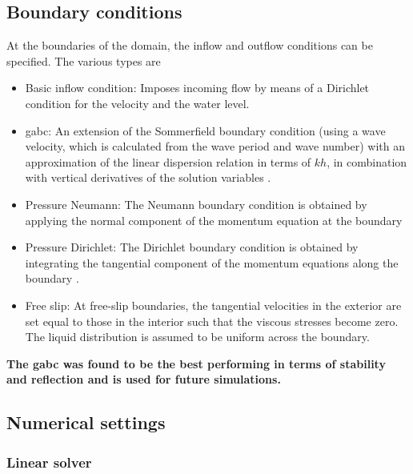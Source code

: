 \subsection{Boundary conditions}
At the boundaries of the domain, the inflow and outflow conditions can be specified. The various types are
\begin{itemize}
    \item Basic inflow condition: Imposes incoming flow by means of a Dirichlet condition for the velocity and the water level. 
    \item \acrfull{gabc}: An extension of the Sommerfield boundary condition (using a wave velocity, which is calculated from the wave period and wave number) with an approximation of the linear dispersion relation in terms of $k h$, in combination with vertical derivatives of the solution variables \citep{Wellens2020}. 
    \item Pressure Neumann: The Neumann boundary condition is obtained by applying the normal component of the momentum equation at the boundary \citep{Abdallah1988} 
    
    \item Pressure Dirichlet: The Dirichlet boundary condition is obtained by integrating the tangential component of the momentum equations along the boundary \citep{Abdallah1988}.
    \item Free slip: At free-slip boundaries, the tangential velocities in the exterior are set equal to those in the interior such that the viscous stresses become zero. The liquid distribution is assumed to be uniform across the boundary. 
\end{itemize}


\textbf{The \acrshort{gabc} was found to be the best performing in terms of stability and reflection and is used for future simulations.}

\subsection{Numerical settings}
\label{subsec: numercial settings validation}
\subsubsection{Linear solver}


